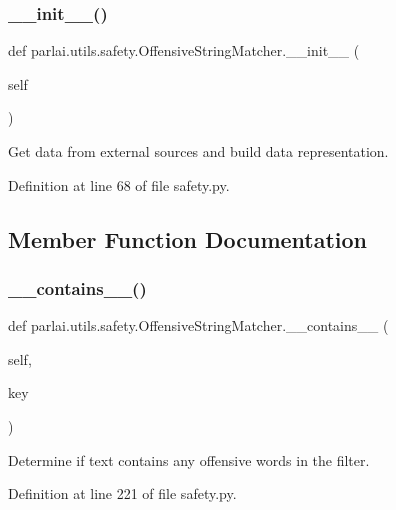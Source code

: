 \subsubsection{\texorpdfstring{\+\_\+\+\_\+init\+\_\+\+\_\+()}{\_\_init\_\_()}}
{\footnotesize\ttfamily def parlai.\+utils.\+safety.\+Offensive\+String\+Matcher.\+\_\+\+\_\+init\+\_\+\+\_\+ (\begin{DoxyParamCaption}\item[{}]{self }\end{DoxyParamCaption})}

\begin{DoxyVerb}Get data from external sources and build data representation.\end{DoxyVerb}
 

Definition at line 68 of file safety.\+py.



\subsection{Member Function Documentation}
\mbox{\label{classparlai_1_1utils_1_1safety_1_1OffensiveStringMatcher_a89e75aea403630f53f41502fead9708e}} 
\subsubsection{\texorpdfstring{\+\_\+\+\_\+contains\+\_\+\+\_\+()}{\_\_contains\_\_()}}
{\footnotesize\ttfamily def parlai.\+utils.\+safety.\+Offensive\+String\+Matcher.\+\_\+\+\_\+contains\+\_\+\+\_\+ (\begin{DoxyParamCaption}\item[{}]{self,  }\item[{}]{key }\end{DoxyParamCaption})}

\begin{DoxyVerb}Determine if text contains any offensive words in the filter.\end{DoxyVerb}
 

Definition at line 221 of file safety.\+py.



